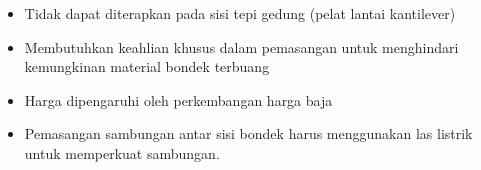 \documentclass[../modul_skb.tex]{subfiles}
\begin{document}
\begin{itemize}
	\item Tidak dapat diterapkan pada sisi tepi gedung (pelat lantai kantilever)
	\item Membutuhkan keahlian khusus dalam pemasangan untuk menghindari kemungkinan material bondek terbuang
	\item Harga dipengaruhi oleh perkembangan harga baja
	\item Pemasangan sambungan antar sisi bondek harus menggunakan las listrik untuk memperkuat sambungan.
\end{itemize}
















\end{document}
